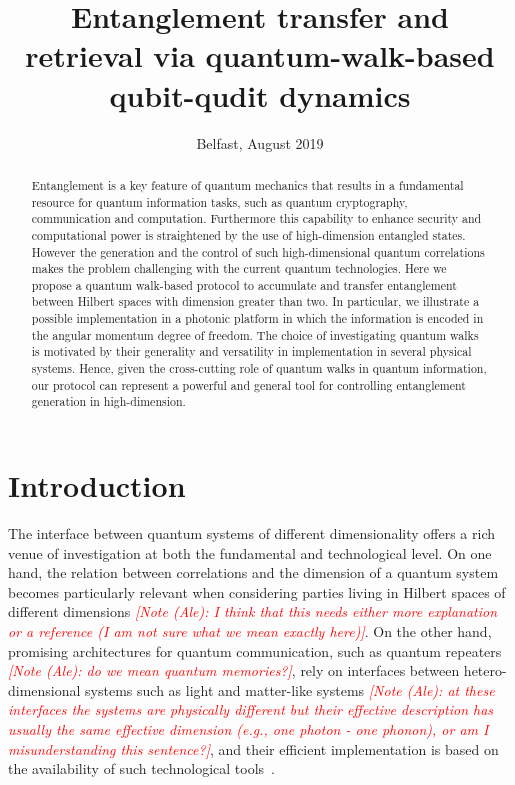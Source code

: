 \documentclass[
	aps, pra,
	superscriptaddress, twocolumn,
	floatfix,
	10pt
]{revtex4-1}
\newcommand{\parTitle}[1]{\noindent{\color{Mahogany}(\emph{#1})}}
\newcommand{\commale}[1]{{\textcolor{red} {\it{[Note (Ale): #1]}}}}
\begin{document}
\title{Entanglement transfer and retrieval via quantum-walk-based qubit-qudit dynamics}
\author{Belfast, August 2019}

\begin{abstract}
Entanglement is a key feature of quantum mechanics that results in a fundamental resource for quantum information tasks, such as quantum cryptography, communication and computation. Furthermore this capability to enhance security and computational power is straightened by the use of high-dimension entangled states. However the generation and the control of such high-dimensional quantum correlations makes the problem  challenging with the current quantum technologies.  Here we propose a quantum walk-based protocol to accumulate and transfer entanglement between Hilbert spaces with dimension greater than two. In particular, we illustrate a possible implementation in a photonic platform in which the information is encoded in the angular momentum degree of freedom. The choice of investigating quantum walks is motivated by their generality and versatility in implementation in several physical systems. Hence, given the cross-cutting role of quantum walks in quantum information, our protocol can represent  a  powerful and general tool for controlling entanglement generation in high-dimension.
\end{abstract}
\maketitle


\section{Introduction}
\parTitle{Interfacing systems of different dimensionality}
The interface between quantum systems of different dimensionality offers a rich venue of investigation at both the fundamental and technological level. On one hand, the relation between correlations and the dimension of a quantum system becomes particularly relevant when considering parties living in Hilbert spaces of different dimensions \commale{I think that this needs either more explanation or a reference (I am not sure what we mean exactly here)}. 
On the other hand, promising architectures for quantum communication, such as quantum repeaters~\cite{Lvovsky2009} \commale{do we mean quantum memories?}, rely on interfaces between hetero-dimensional systems such as light and matter-like systems \commale{at these interfaces the systems are physically different but their effective description has usually the same effective dimension (e.g., one photon - one phonon), or am I misunderstanding this sentence?}, and their efficient implementation is based on the availability of such technological tools~\cite{Kimble2008,Hammerer2010,Brask2010}.
\end{document}

